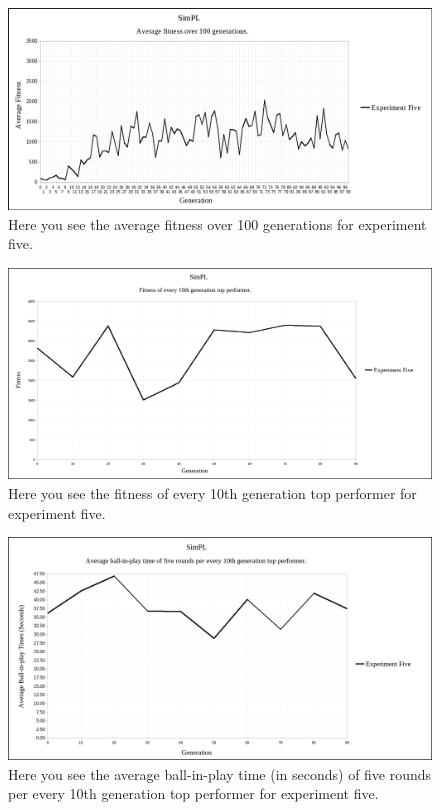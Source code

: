 \documentclass[a4paper,10pt]{article}
\begin{document}
\begin{figure}[H]  
  \centering
  \includegraphics[width=1\textwidth]{figures/exp5_avg_fit.png}
  \caption{Here you see the average fitness over 100 generations for experiment five.}
  \label{fig:exp5_avg_fit}
\end{figure}

\begin{figure}[H]  
  \centering
  \includegraphics[width=1\textwidth]{figures/exp5_10_tops.png}
  \caption{Here you see the fitness of every 10th generation top performer for experiment five.}
  \label{fig:exp5_10_tops}
\end{figure}

\begin{figure}[H]  
  \centering
  \includegraphics[width=1\textwidth]{figures/exp5_10_tops_times.png}
  \caption{Here you see the average ball-in-play time (in seconds) of five rounds per every 10th generation top performer for experiment five.}
  \label{fig:exp5_10_tops_times}
\end{figure}
\end{document}
